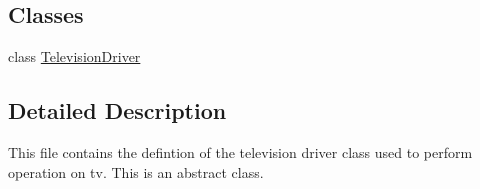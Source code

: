 \subsection*{Classes}
\begin{DoxyCompactItemize}
\item 
class \hyperlink{classTelevisionDriver}{Television\+Driver}
\end{DoxyCompactItemize}


\subsection{Detailed Description}
This file contains the defintion of the television driver class used to perform operation on tv. This is an abstract class. 


